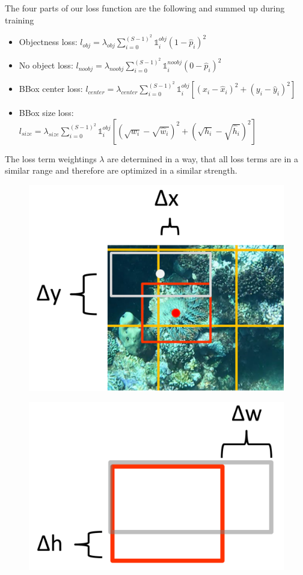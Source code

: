 \documentclass[landscape,a2,final,12pt]{issposter}
\begin{document}
\begin{multicols}{3}
\begin{samepage}
\begin{small}
            The four parts of our loss function are the following and summed up during training 
            \begin{itemize}
                \item Objectness loss: \quad $l_{obj} = \lambda_{obj} \sum_{i=0}^{(S-1)^2} \mathds{1}_{i}^{obj} (1 - \hat{p}_i)^2  $
                \item No object loss: \quad \quad $l_{noobj} = \lambda_{noobj} \sum_{i=0}^{(S-1)^2} \mathds{1}_{i}^{noobj} (0 - \hat{p}_i)^2  $
                \item BBox center loss: \quad $l_{center} = \lambda_{center} \sum_{i=0}^{(S-1)^2} \mathds{1}_{i}^{obj} [(x_i - \hat{x}_i)^2 + (y_i - \hat{y}_i)^2] $
                \item BBox size loss: \quad $l_{size} = \lambda_{size} \sum_{i=0}^{(S-1)^2} \mathds{1}_{i}^{obj} [(\sqrt{w_i} - \sqrt{\hat{w}_i})^2 + (\sqrt{h_i} - \sqrt{\hat{h}_i})^2] $
            \end{itemize}

            The loss term weightings $\lambda$ are determined in a way, that all loss terms are in a 
            similar range and therefore are optimized in a similar strength.

            \begin{figure}
                \centering
                \begin{minipage}{.5\textwidth}
                \centering
                \includegraphics[width=.4\linewidth]{5_loss_center.png}
                \label{fig:test1}
                \end{minipage}%
                \begin{minipage}{.5\textwidth}
                \centering
                \includegraphics[width=.4\linewidth]{5_loss_size.png}
                \label{fig:test2}
                \end{minipage}
                \end{figure}
            


\end{small}
\end{samepage}
\end{multicols}
\end{document}
